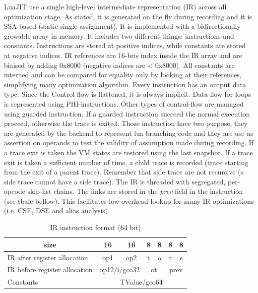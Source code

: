 LuaJIT use a single high-level intermediate representation (IR) across all
optimization stage. As stated, it is generated on the fly during recording and
it is SSA based (static single assignment). It is implemented with a
bidirectionally growable array in memory. It includes two different things:
instructions and constants. Instructions are stored at positive indices, while
constants are stored at negative indices. IR references are 16-bits index inside
the IR array and are biaised by adding 0x8000 (negative indices are < 0x8000).
All constants are interned and can be compared for equality only by looking at
their references, simplifying many optimization algorithm. Every instruction has
an output data type. Since the Control-flow is flattened, it is always implicit.
Data-flow for loops is represented using PHI-instructions. Other types of
control-flow are managed using guarded instruction. If a guarded instruction
succeed the normal execution proceed, otherwise the trace is exited. Those
instruction have two purpose, they are generated by the backend to represent
lua branching code and they are use as assertion on operands to test the
validity of assumption made during recording. If a trace exit is taken the VM
states are restored using the last snapshot. If a trace exit is taken a
sufficient number of time, a child trace is recorded
(trace starting from the exit of a parent trace). Remember that side trace are
not recursive (a side trace cannot have a side trace). The IR is threaded with
segregated, per-opcode skip-list chains. The links are stored in the \emph{prev}
field in the instruction (see tbale bellow). This facilitates low-overhead
lookup for many IR optimizations (i.e. CSE, DSE and alias analysis).

\begin{table}[H]
\centering
\caption{IR instruction format (64 bit)}
\label{tab:ir-format}
\begin{tabular}{|l|c|c|c|c|c|c|}
\hline
\multicolumn{1}{|c|}{size}    & 16              & 16              & 8          & 8          & 8           & 8           \\ \hline
IR after register allocation  & op1             & op2             & t          & o          & r           & s           \\ \hline
IR before register allocation & \multicolumn{2}{c|}{op12/i/gco32} & \multicolumn{2}{c|}{ot} & \multicolumn{2}{c|}{prev} \\ \hline
Constants                     & \multicolumn{6}{c|}{TValue/gco64}                                                       \\ \hline
\end{tabular}
\end{table}

